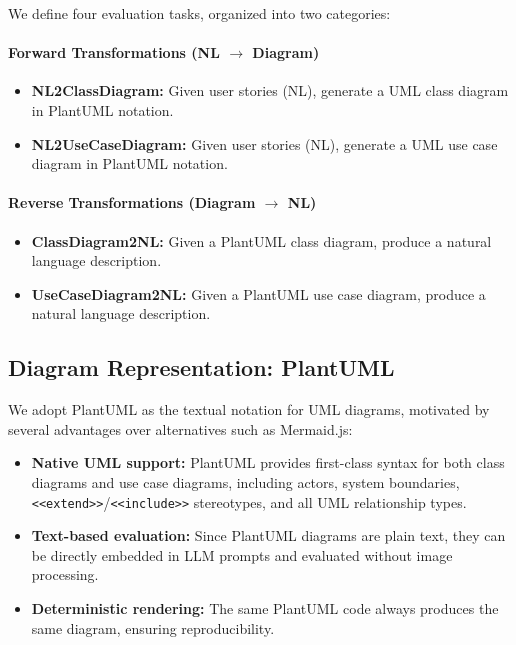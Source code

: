 \documentclass[lettersize,journal]{IEEEtran}
\begin{document}
We define four evaluation tasks, organized into two categories:

\paragraph{Forward Transformations (NL $\rightarrow$ Diagram)}
\begin{itemize}
    \item \textbf{NL2ClassDiagram:} Given user stories (NL), generate a UML class diagram in PlantUML notation.
    \item \textbf{NL2UseCaseDiagram:} Given user stories (NL), generate a UML use case diagram in PlantUML notation.
\end{itemize}

\paragraph{Reverse Transformations (Diagram $\rightarrow$ NL)}
\begin{itemize}
    \item \textbf{ClassDiagram2NL:} Given a PlantUML class diagram, produce a natural language description.
    \item \textbf{UseCaseDiagram2NL:} Given a PlantUML use case diagram, produce a natural language description.
\end{itemize}

\subsection{Diagram Representation: PlantUML}

We adopt PlantUML as the textual notation for UML diagrams, motivated by several advantages over alternatives such as Mermaid.js:

\begin{itemize}
    \item \textbf{Native UML support:} PlantUML provides first-class syntax for both class diagrams and use case diagrams, including actors, system boundaries, \texttt{<<extend>>}/\texttt{<<include>>} stereotypes, and all UML relationship types.
    \item \textbf{Text-based evaluation:} Since PlantUML diagrams are plain text, they can be directly embedded in LLM prompts and evaluated without image processing.
    \item \textbf{Deterministic rendering:} The same PlantUML code always produces the same diagram, ensuring reproducibility.
\end{itemize}
\end{document}
